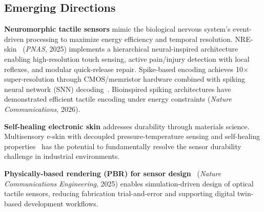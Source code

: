 \subsection{Emerging Directions}

\textbf{Neuromorphic tactile sensors} mimic the biological nervous system's event-driven processing to maximize energy efficiency and temporal resolution. NRE-skin~\cite{gao2025nreskin} (\emph{PNAS}, 2025) implements a hierarchical neural-inspired architecture enabling high-resolution touch sensing, active pain/injury detection with local reflexes, and modular quick-release repair. Spike-based encoding achieves 10$\times$ super-resolution through CMOS/memristor hardware combined with spiking neural network (SNN) decoding~\cite{various2025spike}. Bioinspired spiking architectures have demonstrated efficient tactile encoding under energy constraints (\emph{Nature Communications}, 2026).

\textbf{Self-healing electronic skin} addresses durability through materials science. Multisensory e-skin with decoupled pressure-temperature sensing and self-healing properties~\cite{various2025eskin} has the potential to fundamentally resolve the sensor durability challenge in industrial environments.

\textbf{Physically-based rendering (PBR) for sensor design}~\cite{various2025pbr} (\emph{Nature Communications Engineering}, 2025) enables simulation-driven design of optical tactile sensors, reducing fabrication trial-and-error and supporting digital twin-based development workflows.
